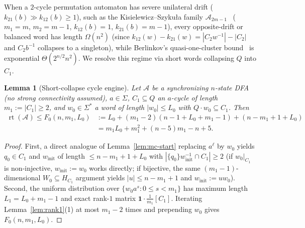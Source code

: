 \documentclass[11pt,a4paper]{article}
\newtheorem{lemma}[theorem]{Lemma}
\theoremstyle{definition}
\theoremstyle{remark}
\newcommand{\rt}{\operatorname{rt}}
\newcommand{\one}{\mathbf{1}}
\newcommand{\cA}{\mathcal{A}}
\newcommand{\ind}[1]{[#1]}
\begin{document}
When a $2$-cycle permutation automaton has severe unilateral drift ($k_{21}(b) \gg k_{12}(b) \ge 1$), such as the Kisielewicz--Szyku\l a family $\cA_{2m-1}$~\cite{KS2015} ($m_1 = m$, $m_2 = m - 1$, $k_{12}(b) = 1$, $k_{21}(b) = m - 1$), every opposite-drift or balanced word has length $\Omega(n^2)$ (since $k_{12}(w) - k_{21}(w) = |C_2 w^{-1}| - |C_2|$ and $C_2 b^{-1}$ collapses to a singleton), while Berlinkov's quasi-one-cluster bound~\cite{Berlinkov2013} is exponential $\Theta(2^{n/2} n^2)$. We resolve this regime via short words collapsing $Q$ into $C_1$.

\begin{lemma}[Short-collapse cycle engine]
\label{lem:collapse-engine}
Let $\cA$ be a synchronizing $n$-state DFA (no strong connectivity assumed), $a \in \Sigma$, $C_1 \subseteq Q$ an $a$-cycle of length $m_1 := |C_1| \ge 2$, and $w_0 \in \Sigma^*$ a word of length $|w_0| \le L_0$ with $Q \cdot w_0 \subseteq C_1$. Then
\begin{align*}
  \rt(\cA) \le F_0(n, m_1, L_0) &:= L_0 + (m_1 - 2)(n - 1 + L_0 + m_1 - 1) + (n - m_1 + 1 + L_0) \\
                                &= m_1 L_0 + m_1^2 + (n - 5)m_1 - n + 5.
\end{align*}
\end{lemma}
\begin{proof}
First, a direct analogue of Lemma~\ref{lem:mc-start} replacing $a^\ell$ by $w_0$ yields $q_0 \in C_1$ and $w_{\mathrm{init}}$ of length $\le n - m_1 + 1 + L_0$ with $|\{q_0\} w_{\mathrm{init}}^{-1} \cap C_1| \ge 2$ (if $w_0|_{C_1}$ is non-injective, $w_{\mathrm{init}} := w_0$ works directly; if bijective, the same $(m_1 - 1)$-dimensional $W_0 \subseteq H_{C_1}$ argument yields $|u| \le n - m_1 + 1$ and $w_{\mathrm{init}} := u w_0$). Second, the uniform distribution over $\{w_0 a^s : 0 \le s < m_1\}$ has maximum length $L_1 = L_0 + m_1 - 1$ and exact rank-$1$ matrix $\one \cdot \frac{1}{m_1}\ind{C_1}$. Iterating Lemma~\ref{lem:rank1}(1) at most $m_1 - 2$ times and prepending $w_0$ gives $F_0(n, m_1, L_0)$.
\end{proof}
\end{document}
